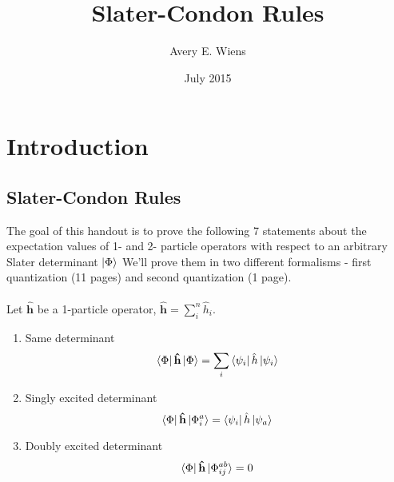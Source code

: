\documentclass{article}
\title{\bf Slater-Condon Rules}
\author{Avery E. Wiens}
\date{July 2015}
\newcommand{\suml}{\sum\limits}
\newcommand{\boldh}{\ensuremath{\mathbf{\hat{h}}}}
\newcommand{\F}{\ensuremath{\Phi}}
\newcommand{\y}{\ensuremath{\psi}}
\begin{document}
\maketitle
\tableofcontents

\newpage



\section{Introduction}

\subsection{Slater-Condon Rules}
The goal of this handout is to prove the following 7 statements about the expectation values of 1- and 2- particle operators with respect to an arbitrary Slater determinant $\ket{\F}$ We'll prove them in two different formalisms - first quantization (11 pages) and second quantization (1 page). \vspace{0.3cm} \\
 \vspace{0.3cm} \\
Let $\boldh$ be a 1-particle operator, $\boldh = \suml_i^n \hat{h}_i $.
\begin{enumerate}
\item Same determinant
\begin{equation}
   \bra{\F}
      \boldh 
   \ket{\F} 
= 
   \suml_i 
      \bra{\y_i} 
         \hat{h}
      \ket{\y_i} 
\end{equation}
\item Singly excited determinant
\begin{equation}
   \bra{\Phi}
      \boldh
   \ket{\Phi_i^a} 
= 
   \bra{\psi_i} 
      \hat{h} 
   \ket{\psi_a}
\end{equation}
\item Doubly excited determinant
\begin{equation}
   \bra{\Phi} 
      \boldh 
   \ket{\Phi_{ij}^{ab}} 
= 
   0
\end{equation}
\end{enumerate}
\end{document}
